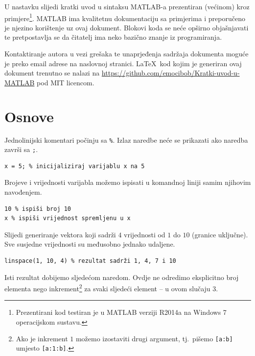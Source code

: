 \documentclass[a4paper, 10pt]{article}
\newcommand{\spec}[1]{\texttt{#1}} %
\begin{document}
U nastavku slijedi kratki uvod u sintaksu MATLAB-a prezentiran (većinom) kroz primjere\footnote{Prezentirani kod testiran je u MATLAB verziji R2014a na Windows 7 operacijskom sustavu.}.
MATLAB ima kvalitetnu dokumentaciju sa primjerima i preporučeno je njezino korištenje uz ovaj dokument.
Blokovi koda se neće opširno objašnjavati te pretpostavlja se da čitatelj ima neko bazično znanje iz programiranja.

Kontaktiranje autora u vezi grešaka te unaprjeđenja sadržaja dokumenta moguće je preko email adrese na naslovnoj stranici.
\LaTeX\ kod kojim je generiran ovaj dokument trenutno se nalazi na \url{https://github.com/emocibob/Kratki-uvod-u-MATLAB} pod MIT licencom.

\clearpage


\section{Osnove}

Jednolinijski komentari počinju sa \spec{\%}.
Izlaz naredbe neće se prikazati ako naredba završi sa \spec{;}.

\begin{lstlisting}
x = 5; % inicijaliziraj varijablu x na 5
\end{lstlisting}

Brojeve i vrijednosti varijabla možemo ispisati u komandnoj liniji samim njihovim navođenjem.

\begin{lstlisting}
10 % ispiši broj 10
x % ispiši vrijednost spremljenu u x
\end{lstlisting}

Slijedi generiranje vektora koji sadrži $4$ vrijednosti od $1$ do $10$ (granice uključne).
Sve susjedne vrijednosti su međusobno jednako udaljene.

\begin{lstlisting}
linspace(1, 10, 4) % rezultat sadrži 1, 4, 7 i 10
\end{lstlisting}

Isti rezultat dobijemo sljedećom naredom.
Ovdje ne odredimo eksplicitno broj elementa nego inkrement\footnote{Ako je inkrement $1$ možemo izostaviti drugi argument, tj.\ pišemo \spec{[a:b]} umjesto \spec{[a:1:b]}.} za svaki sljedeći element -- u ovom slučaju $3$.
\end{document}
